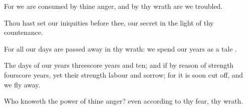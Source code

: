 {\Q {}For we are
consumed by thine
anger, and by thy
wrath are we
troubled.


\par }{\Q {}Thou hast
set our
iniquities before thee, our
secret
{} in the
light of thy
countenance.


\par }{\Q {}For all our
days are passed
away in thy
wrath: we
spend our
years as a
tale
{}.


\par }{\Q {}The
days of our
years
{}
threescore
years and
ten; and if by reason of
strength
{}
fourscore
years, yet
{} their
strength
labour and
sorrow; for it is
soon cut
off, and we fly
away.


\par }{\Q {}Who
knoweth the
power of thine
anger? even according to thy
fear,
{} thy
wrath.


\par }{\BB \par }
